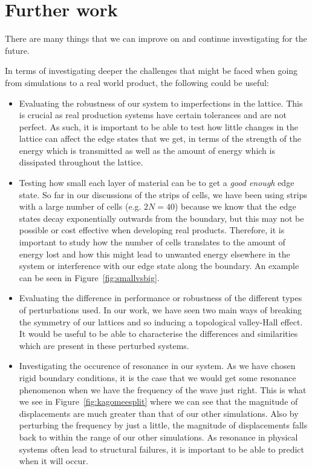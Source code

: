 \section{Further work}
There are many things that we can improve on and continue investigating for the
future. 

In terms of investigating deeper the challenges that might be faced when going
from simulations to a real world product, the following could be useful:
\begin{itemize}
\item Evaluating the robustness of our system to imperfections in the lattice.
This is crucial as real production systems have certain tolerances and are not
perfect. As such, it is important to be able to test how little changes in the
lattice can affect the edge states that we get, in terms of the strength of the
energy which is transmitted as well as the amount of energy which is dissipated
throughout the lattice.

\item Testing how small each layer of material can be to get a \textit{good
enough} edge state. So far in our discussions of the strips of cells, we have
been using strips with a large number of cells (e.g. $2N=40$) because we know
that the edge states decay exponentially outwards from the boundary, but this
may not be possible or cost effective when developing real products. Therefore,
it is important to study how the number of cells translates to the amount of
energy lost and how this might lead to unwanted energy elsewhere in the system
or interference with our edge state along the boundary. An example can be seen
in Figure~\ref{fig:smallvsbig}.

\item Evaluating the difference in performance or robustness of the different
types of perturbations used. In our work, we have seen two main ways of
breaking the symmetry of our lattices and so inducing a topological valley-Hall
effect. It would be useful to be able to characterise the differences and
similarities which are present in these perturbed systems.

\item Investigating the occurence of resonance in our system. As we have chosen
rigid boundary conditions, it is the case that we would get some resonance
phenomenon when we have the frequency of the wave just right. This is what we
see in Figure~\ref{fig:kagomeesplit} where we can see that the magnitude of
displacements are much greater than that of our other simulations. Also by
perturbing the frequency by just a little, the magnitude of displacements falls
back to within the range of our other simulations. As resonance in physical
systems often lead to structural failures, it is important to be able to
predict when it will occur.
\end{itemize}


